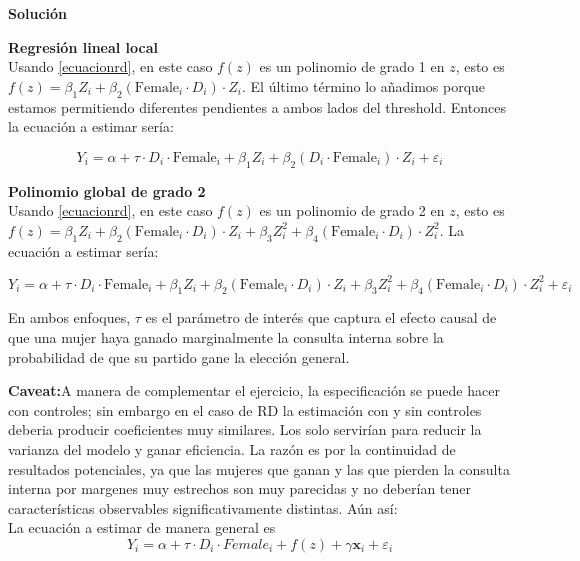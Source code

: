 \documentclass[a4paper, answers, addpoints, 11pt]{exam}
\newenvironment{solucion}{%
  \begin{mdframed}[
    backgroundcolor=blue!5,    %
    linecolor=blue!50,          %
    linewidth=2pt,              %
    leftmargin=10pt,            %
    rightmargin=8pt,           %
    topline=true,              %
    bottomline=true,            %
    roundcorner=10pt,           %
    innerleftmargin=10pt,       %
    innerrightmargin=10pt,      %
    innerbottommargin=10pt,     %
    innertopmargin=10pt         %
  ]%
  \begin{tcolorbox}[colframe=blue!50!black, colback=blue!50, coltitle=white, sharp corners=all, boxrule=1mm, width=\textwidth, halign=left, valign=center, top=0mm, bottom=0mm, left=0mm, right=0mm] \textbf{Solución} \end{tcolorbox} }{\end{mdframed}}
\begin{document}
\begin{enumerate}[resume]
\begin{enumerate}
\begin{solucion}
\textbf{Regresión lineal local}\\
Usando \ref{ecuacionrd}, en este caso $f(z)$ es un polinomio de grado 1 en $z$, esto es $f(z)=\beta_1 Z_i +\beta_2 (\text{Female}_i \cdot D_i )\cdot Z_i$. El último término lo añadimos porque estamos permitiendo diferentes pendientes a ambos lados del threshold. Entonces la ecuación a estimar sería:

% 

$$
Y_i = \alpha + \tau \cdot D_i  \cdot \text{Female}_i + \beta_1 Z_i +\beta_2 ( D_i  \cdot \text{Female}_i )\cdot Z_i + \varepsilon_i$$

\vspace{0.5cm}

\textbf{Polinomio global de grado 2}\\
Usando \ref{ecuacionrd}, en este caso $f(z)$ es un polinomio de grado 2 en $z$, esto es $f(z)=\beta_1 Z_i +\beta_2 (\text{Female}_i \cdot D_i )\cdot Z_i +\beta_3 Z_i^2+ \beta_4 (\text{Female}_i \cdot D_i )\cdot Z_i^2 $. La ecuación a estimar sería:

$$
Y_i = \alpha + \tau \cdot D_i  \cdot \text{Female}_i + \beta_1 Z_i +\beta_2 (\text{Female}_i \cdot D_i )\cdot Z_i +\beta_3 Z_i^2+ \beta_4 (\text{Female}_i \cdot D_i )\cdot Z_i^2+ \varepsilon_i$$


En ambos enfoques, \(\tau\) es el parámetro de interés que captura el efecto causal de que una mujer haya ganado marginalmente la consulta interna sobre la probabilidad de que su partido gane la elección general. 
\begin{mdframed}[backgroundcolor=moraditoClaro]
\textbf{Caveat:}A manera de complementar el ejercicio, la especificación se puede hacer con controles; sin embargo en el caso de RD la estimación con y sin controles deberia producir coeficientes muy similares. Los solo servirían para reducir la varianza del modelo y ganar eficiencia. La razón es por la continuidad de resultados potenciales, ya que las mujeres que ganan y las que pierden la consulta interna por margenes muy estrechos son muy parecidas y  no deberían tener características observables significativamente distintas. Aún así: \\

La ecuación a estimar de manera general es
 \begin{equation} 
Y_i = \alpha  +\tau \cdot D_i \cdot Female_i + f(z)+ \gamma \textbf{x}_i+\varepsilon_i
\end{equation}


\end{mdframed}
\end{solucion}
\end{enumerate}
\end{enumerate}
\end{document}
